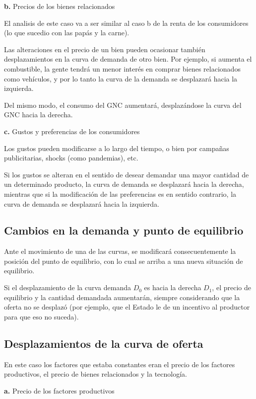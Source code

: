\textbf{b.} Precios de los bienes relacionados

El analisis de este caso va a ser similar al caso b de la renta de los consumidores
(lo que sucedio con las papás y la carne).

Las alteraciones en el precio de un bien pueden ocasionar también desplazamientos en la curva de demanda
de otro bien. Por ejemplo, si aumenta el combustible, la gente tendrá un menor interés
en comprar bienes relacionados como vehículos,
y por lo tanto la curva de la demanda se desplazará hacia la izquierda.

Del mismo modo, el consumo del GNC aumentará,
desplazándose la curva del GNC hacia la derecha.

\textbf{c.} Gustos y preferencias de los consumidores

Los gustos pueden modificarse a lo largo del tiempo,
o bien por campañas publicitarias,
shocks (como pandemias),
etc.

Si los gustos se alteran en el sentido de desear demandar una mayor cantidad de un determinado producto,
la curva de demanda se desplazará hacia la derecha,
mientras que si la modificación de las preferencias es en sentido contrario,
la curva de demanda se desplazará hacia la izquierda.

\subsection{Cambios en la demanda y punto de equilibrio}

Ante el movimiento de una de las curvas,
se modificará consecuentemente la posición del punto de equilibrio,
con lo cual se arriba a una nueva situación de equilibrio.

Si el desplazamiento de la curva demanda \(D_0\) es hacia la derecha \(D_1\),
el precio de equilibrio y la cantidad demandada aumentarán,
siempre considerando que la oferta no se desplazó
(por ejemplo, que el Estado le de un incentivo al productor para que eso no suceda).

\subsection{Desplazamientos de la curva de oferta}

En este caso los factores que estaba constantes eran el precio de los factores productivos,
el precio de bienes relacionados y la tecnología.

\textbf{a.} Precio de los factores productivos

